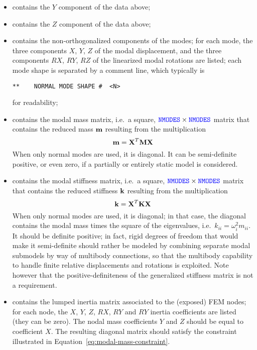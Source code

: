 \begin{itemize}
\item {} contains the $Y$ component of the data above;

\item {} contains the $Z$ component of the data above;

\item {} contains the non-orthogonalized components 
of the  modes; for each mode, the three components 
$X$, $Y$, $Z$ of the modal displacement, and the three components
$RX$, $RY$, $RZ$ of the linearized modal rotations are listed;
each mode shape is separated by a comment line, which typically is
\begin{verbatim}
**    NORMAL MODE SHAPE #  <N>
\end{verbatim}
for readability;

\item {} contains the modal mass matrix,
i.e.\ a square, $\textcolor{blue}{\texttt{NMODES}} \times \textcolor{blue}{\texttt{NMODES}}$ matrix that contains
the reduced mass
$\bm{\mathbf m}$
resulting from the multiplication
\begin{equation}
	\label{eq:modal-mass-constraint}
	\bm{\mathbf m} = \bm{\mathbf X}^T \bm{\mathbf M} \bm{\mathbf X}
\end{equation}
When only normal modes are used, it is diagonal.
It can be semi-definite positive, or even zero, if a partially 
or entirely static model is considered.

\item {} contains the modal stiffness matrix,
i.e.\ a square, $\textcolor{blue}{\texttt{NMODES}} \times \textcolor{blue}{\texttt{NMODES}}$ matrix that contains
the reduced stiffness
$\bm{\mathbf k}$
resulting from the multiplication
\begin{equation}
	\bm{\mathbf k} = \bm{\mathbf X}^T \bm{\mathbf K} \bm{\mathbf X}
\end{equation}
When only normal modes are used, it is diagonal; in that case,
the diagonal contains the modal mass times the square 
of the eigenvalues, i.e.\ $k_{ii} = \omega_i^2 m_{ii}$.
It should be definite positive; in fact, rigid degrees of freedom
that would make it semi-definite should rather be modeled by combining
separate modal submodels by way of multibody connections, so that
the multibody capability to handle finite relative displacements
and rotations is exploited.
Note however that the positive-definiteness of the generalized
stiffness matrix is not a requirement.

\item {} contains the lumped inertia matrix
associated to the  (exposed) FEM nodes;
for each node, the $X$, $Y$, $Z$, $RX$, $RY$ and $RY$ inertia
coefficients are listed (they can be zero).
The nodal mass coefficients $Y$ and $Z$ should be equal
to coefficient $X$.
The resulting diagonal matrix should satisfy the constraint
illustrated in Equation~\ref{eq:modal-mass-constraint}.


\end{itemize}
